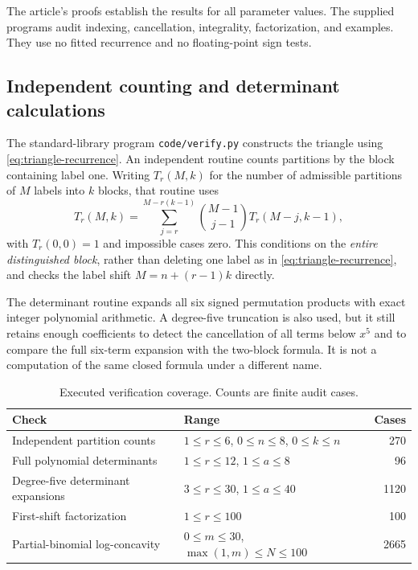 \documentclass[11pt,a4paper]{article}
\theoremstyle{definition}
\numberwithin{equation}{section}
\begin{document}
The article's proofs establish the results for all parameter values.
The supplied programs audit indexing, cancellation, integrality,
factorization, and examples. They use no fitted recurrence and no
floating-point sign tests.

\subsection{Independent counting and determinant calculations}

The standard-library program \texttt{code/verify.py} constructs the
triangle using \eqref{eq:triangle-recurrence}. An independent routine
counts partitions by the block containing label one. Writing $T_r(M,k)$
for the number of admissible partitions of $M$ labels into $k$ blocks,
that routine uses
\begin{equation}
 T_r(M,k)=\sum_{j=r}^{M-r(k-1)}
       \binom{M-1}{j-1}T_r(M-j,k-1),
 \label{eq:independent-count}
\end{equation}
with $T_r(0,0)=1$ and impossible cases zero. This conditions on the
\emph{entire distinguished block}, rather than deleting one label as in
\eqref{eq:triangle-recurrence}, and checks the label shift
$M=n+(r-1)k$ directly.

The determinant routine expands all six signed permutation products
with exact integer polynomial arithmetic. A degree-five truncation is
also used, but it still retains enough coefficients to detect the
cancellation of all terms below $x^5$ and to compare the full six-term
expansion with the two-block formula. It is not a computation of the
same closed formula under a different name.

\begin{table}[ht]
\centering
\caption{Executed verification coverage. Counts are finite audit cases.}
\label{tab:checks}
\small
\begin{tabular}{@{}p{5.1cm}p{6.7cm}r@{}}
\toprule
Check & Range & Cases\\
\midrule
Independent partition counts & $1\le r\le6$, $0\le n\le8$, $0\le k\le n$ &270\\
Full polynomial determinants & $1\le r\le12$, $1\le a\le8$ &96\\
Degree-five determinant expansions & $3\le r\le30$, $1\le a\le40$ &1120\\
First-shift factorization & $1\le r\le100$ &100\\
Partial-binomial log-concavity & $0\le m\le30$, $\max(1,m)\le N\le100$ &2665\\
\bottomrule
\end{tabular}
\end{table}
\end{document}
